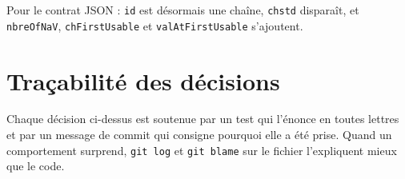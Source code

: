 \documentclass[11pt,a4paper]{report}
\begin{document}
Pour le contrat JSON : \texttt{id} est désormais une chaîne,
\texttt{chstd} disparaît, et \texttt{nbreOfNaV}, \texttt{chFirstUsable}
et \texttt{valAtFirstUsable} s'ajoutent.

\chapter{Traçabilité des décisions}\label{chap:raisonnement}

Chaque décision ci-dessus est soutenue par un test qui l'énonce en
toutes lettres et par un message de commit qui consigne pourquoi elle a
été prise. Quand un comportement surprend, \texttt{git\ log} et
\texttt{git\ blame} sur le fichier l'expliquent mieux que le code.



\printbibliography[heading=bibintoc, title={Bibliographie}]
\end{document}
